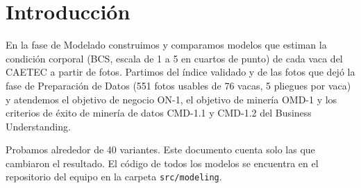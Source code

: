 \section*{Introducción}

En la fase de Modelado construimos y comparamos modelos que estiman la condición corporal (BCS, escala de 1 a 5 en cuartos de punto) de cada vaca del CAETEC a partir de fotos. Partimos del índice validado y de las fotos que dejó la fase de Preparación de Datos (551 fotos usables de 76 vacas, 5 pliegues por vaca) y atendemos el objetivo de negocio ON-1, el objetivo de minería OMD-1 y los criterios de éxito de minería de datos CMD-1.1 y CMD-1.2 del Business Understanding.

Probamos alrededor de 40 variantes. Este documento cuenta solo las que cambiaron el resultado. El código de todos los modelos se encuentra en el repositorio del equipo en la carpeta \nolinkurl{src/modeling}.
